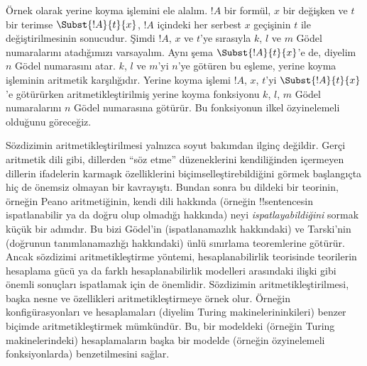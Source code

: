 Örnek olarak yerine koyma işlemini ele alalım. $!A$ bir formül, $x$ bir
değişken ve $t$ bir terimse $\Subst{!A}{t}{x}$, $!A$ içindeki her serbest
$x$ geçişinin $t$ ile değiştirilmesinin sonucudur. Şimdi $!A$, $x$ ve $t$'ye
sırasıyla $k$, $l$ ve $m$ Gödel numaralarını atadığımızı varsayalım. Aynı
şema $\Subst{!A}{t}{x}$'e de, diyelim $n$ Gödel numarasını atar. $k$, $l$
ve $m$'yi $n$'ye götüren bu eşleme, yerine koyma işleminin aritmetik
karşılığıdır. Yerine koyma işlemi $!A$, $x$, $t$'yi
$\Subst{!A}{t}{x}$'e götürürken aritmetikleştirilmiş yerine koyma fonksiyonu
$k$, $l$, $m$ Gödel numaralarını $n$ Gödel numarasına götürür. Bu
fonksiyonun ilkel özyinelemeli olduğunu göreceğiz.

Sözdizimin aritmetikleştirilmesi yalnızca soyut bakımdan ilginç değildir.
Gerçi aritmetik dili gibi, dillerden ``söz etme'' düzeneklerini kendiliğinden
içermeyen dillerin ifadelerin karmaşık özelliklerini biçimselleştirebildiğini
görmek başlangıçta hiç de önemsiz olmayan bir kavrayıştı. Bundan sonra bu
dildeki bir teorinin, örneğin Peano aritmetiğinin, kendi dili hakkında
(örneğin !!{sentence}s{}in ispatlanabilir ya da doğru olup olmadığı hakkında)
neyi \emph{ispatlayabildiğini} sormak küçük bir adımdır. Bu bizi Gödel'in
(ispatlanamazlık hakkındaki) ve Tarski'nin (doğrunun tanımlanamazlığı
hakkındaki) ünlü sınırlama teoremlerine götürür. Ancak sözdizimi
aritmetikleştirme yöntemi, hesaplanabilirlik teorisinde teorilerin hesaplama
gücü ya da farklı hesaplanabilirlik modelleri arasındaki ilişki gibi önemli
sonuçları ispatlamak için de önemlidir. Sözdizimin aritmetikleştirilmesi,
başka nesne ve özellikleri aritmetikleştirmeye örnek olur. Örneğin
konfigürasyonları ve hesaplamaları (diyelim Turing makinelerininkileri) benzer
biçimde aritmetikleştirmek mümkündür. Bu, bir modeldeki (örneğin Turing
makinelerindeki) hesaplamaların başka bir modelde (örneğin özyinelemeli
fonksiyonlarda) benzetilmesini sağlar.

